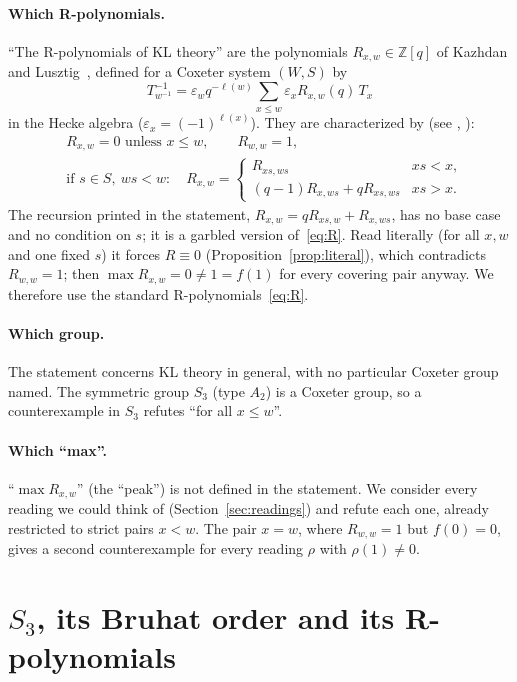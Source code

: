 \documentclass[11pt]{article}
\theoremstyle{remark}
\begin{document}
\paragraph{Which R-polynomials.} ``The R-polynomials of KL theory'' are the
polynomials $R_{x,w}\in\mathbb Z[q]$ of Kazhdan and Lusztig~\cite{kl}, defined
for a Coxeter system $(W,S)$ by
\[
T_{w^{-1}}^{-1}=\varepsilon_w q^{-\ell(w)}\sum_{x\le w}\varepsilon_x R_{x,w}(q)\,T_x
\]
in the Hecke algebra ($\varepsilon_x=(-1)^{\ell(x)}$). They are characterized
by (see \cite[\S7.5]{humphreys}, \cite[Ch.~5]{bb}):
\begin{equation}\label{eq:R}
\begin{aligned}
&R_{x,w}=0 \text{ unless } x\le w,\qquad R_{w,w}=1,\\
&\text{if } s\in S,\ ws<w: \quad R_{x,w}=\begin{cases}R_{xs,ws}& xs<x,\\
(q-1)R_{x,ws}+qR_{xs,ws}& xs>x.\end{cases}
\end{aligned}
\end{equation}
The recursion printed in the statement, $R_{x,w}=qR_{xs,w}+R_{x,ws}$, has no base
case and no condition on $s$; it is a garbled version of~\eqref{eq:R}. Read
literally (for all $x,w$ and one fixed $s$) it forces $R\equiv0$
(Proposition~\ref{prop:literal}), which contradicts $R_{w,w}=1$; then
$\max R_{x,w}=0\ne1=f(1)$ for every covering pair anyway. We therefore use the
standard R-polynomials~\eqref{eq:R}.

\paragraph{Which group.} The statement concerns KL theory in general, with no
particular Coxeter group named. The symmetric group $S_3$ (type $A_2$) is a Coxeter
group, so a counterexample in $S_3$ refutes ``for all $x\le w$''.

\paragraph{Which ``max''.} ``$\max R_{x,w}$'' (the ``peak'') is not defined in the
statement. We consider every reading we could think of
(Section~\ref{sec:readings}) and refute each one, already restricted to strict
pairs $x<w$. The pair $x=w$, where $R_{w,w}=1$ but $f(0)=0$, gives a second
counterexample for every reading $\rho$ with $\rho(1)\ne0$.

\section{\texorpdfstring{$S_3$, its Bruhat order and its R-polynomials}{S3, its Bruhat order and its R-polynomials}}
\end{document}
